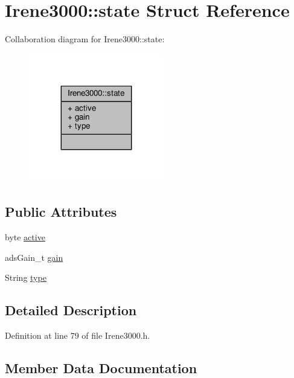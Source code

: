\hypertarget{structIrene3000_1_1state}{}\section{Irene3000\+:\+:state Struct Reference}
\label{structIrene3000_1_1state}


Collaboration diagram for Irene3000\+:\+:state\+:
\nopagebreak
\begin{figure}[H]
\begin{center}
\leavevmode
\includegraphics[width=167pt]{structIrene3000_1_1state__coll__graph}
\end{center}
\end{figure}
\subsection*{Public Attributes}
\begin{DoxyCompactItemize}
\item 
byte \hyperlink{structIrene3000_1_1state_af7ff649f20b9a2fb6ca0f949ee9a25ce}{active}
\item 
ads\+Gain\+\_\+t \hyperlink{structIrene3000_1_1state_a1ecf69d38cb31ecaf6b3602a3f3e93cb}{gain}
\item 
String \hyperlink{structIrene3000_1_1state_a9897a7e02727db6351d44006eec73799}{type}
\end{DoxyCompactItemize}


\subsection{Detailed Description}


Definition at line 79 of file Irene3000.\+h.



\subsection{Member Data Documentation}
\mbox{\label{structIrene3000_1_1state_af7ff649f20b9a2fb6ca0f949ee9a25ce}} 

